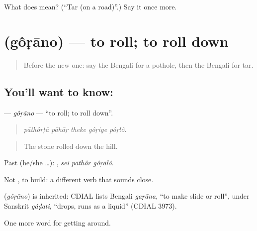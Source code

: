 \begin{tcolorbox}[breakable,colback=teal!4,colframe=teal!35!black,title={Before you move on}]
What does  mean? (\textquotedblleft{}Tar (on a road)\textquotedblright{}.) Say it once more.
\end{tcolorbox}
\section[\texorpdfstring{\bn{গড়ানো} (gôṛāno)}{গড়ানো (gôṛāno)}]{ (gôṛāno) — to roll; to roll down}

\label{lesson:BN-C390-gorano}



\begin{quote}
Before the new one: say the Bengali for a pothole, then the Bengali for tar.
\end{quote}

\subsection*{You'll want to know: }
\textbf{} — \emph{gôṛāno} — \textquotedblleft{}to roll; to roll down\textquotedblright{}.

\begin{quote}
    
\end{quote}

\begin{quote}
\emph{pāthôrṭā pāhāṛ theke gôṛiye pôṛlô.}
\end{quote}

\begin{quote}
The stone rolled down the hill.
\end{quote}

Past (he/she …):   , \emph{sei pāthôr gôṛālô}.

Not , to build: a different verb that sounds close.

\begin{cousinweb}
\textbf{} (\emph{gôṛāno}) is inherited: CDIAL lists Bengali \emph{gaṛāna}, \textquotedblleft{}to make slide or roll\textquotedblright{}, under Sanskrit \emph{gáḍati}, \textquotedblleft{}drops, runs as a liquid\textquotedblright{} (CDIAL 3973).
\end{cousinweb}

\begin{grammarlens}[title={What you've built}]
One more word for getting around.
\end{grammarlens}

